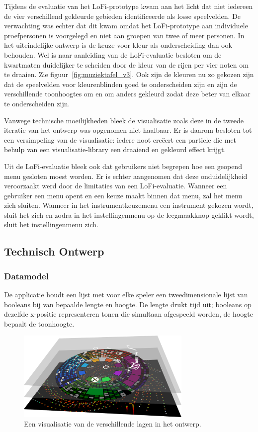 \documentclass{acm}
\begin{document}
Tijdens de evaluatie van het LoFi-prototype kwam aan het licht dat niet iedereen de vier verschillend gekleurde gebieden identificeerde als losse speelvelden. De verwachting was echter dat dit kwam omdat het LoFi-prototype aan individuele proefpersonen is voorgelegd en niet aan groepen van twee of meer personen. In het uiteindelijke ontwerp is de keuze voor kleur als onderscheiding dan ook behouden. Wel is naar aanleiding van de LoFi-evaluatie besloten om de kwartmaten duidelijker te scheiden door de kleur van de rijen per vier noten om te draaien. Zie figuur~\ref{fig:muziektafel_v3}.  Ook zijn de kleuren nu zo gekozen zijn dat de speelvelden voor kleurenblinden goed te onderscheiden zijn en zijn de verschillende toonhoogtes om en om anders gekleurd zodat deze beter van elkaar te onderscheiden zijn.

Vanwege technische moeilijkheden bleek de visualisatie zoals deze in de tweede iteratie van het ontwerp was opgenomen niet haalbaar. Er is daarom besloten tot een versimpeling van de visualisatie: iedere noot cre\"eert een particle die met behulp van een visualisatie-library een draaiend en gekleurd effect krijgt.

Uit de LoFi-evaluatie bleek ook dat gebruikers niet begrepen hoe een geopend menu gesloten moest worden. Er is echter aangenomen dat deze onduidelijkheid veroorzaakt werd door de limitaties van een LoFi-evaluatie. Wanneer een gebruiker een menu opent en een keuze maakt binnen dat menu, zal het menu zich sluiten. Wanneer in het instrumentkeuzemenu een instrument gekozen wordt, sluit het zich en zodra in het instellingenmenu op de leegmaakknop geklikt wordt, sluit het instellingenmenu zich.

\subsection{Technisch Ontwerp}
\subsubsection{Datamodel}
De applicatie houdt een lijst met voor elke speler een tweedimensionale lijst van booleans bij van bepaalde lengte en hoogte. De lengte drukt tijd uit; booleans op dezelfde x-positie representeren tonen die simultaan afgespeeld worden, de hoogte bepaalt de toonhoogte. 

\begin{figure}
  \includegraphics[width=84mm]{img/muziektafel_layers}
  \caption{Een visualisatie van de verschillende lagen in het ontwerp.}
  \label{fig:muziektafel_layers}
\end{figure}
\end{document}
